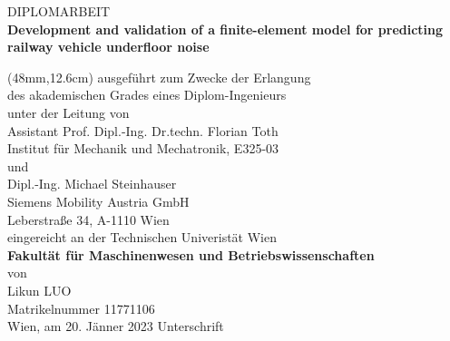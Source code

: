 \vspace{2.8cm}
\hspace{17mm}
\begin{minipage}{14cm} 
	{\LARGE DIPLOMARBEIT} \\[12mm]
	\doublespacing\textbf{\LARGE Development and validation of a finite-element model for predicting railway vehicle underfloor noise}
\end{minipage}

	{\fontsize{12}{1} \selectfont
\begin{textblock*}{14cm}(48mm,12.6cm)
	\noindent
	ausgeführt zum Zwecke der Erlangung \\[2.5mm]
	des akademischen Grades eines Diplom-Ingenieurs \\[2.5mm]
	unter der Leitung von \\[8mm]
	Assistant Prof. Dipl.-Ing. Dr.techn. Florian Toth \\[2.5mm]
	Institut für Mechanik und Mechatronik, E325-03 \\[8mm]
    und \\[8mm]
    Dipl.-Ing. Michael Steinhauser \\[2.5mm]
    Siemens Mobility Austria GmbH \\[2.5mm]
    Leberstraße 34, A-1110 Wien \\[8mm]
	eingereicht an der Technischen Univeristät Wien \\[2.5mm]
	\textbf{Fakultät für Maschinenwesen und Betriebswissenschaften} \\[4mm]
	von \\[20mm]
	Likun LUO \\[2.5mm]
	Matrikelnummer 11771106 \\[2.5mm]
	Wien, am 20. Jänner 2023 \hspace{50mm} Unterschrift\\[25mm]
\end{textblock*}}